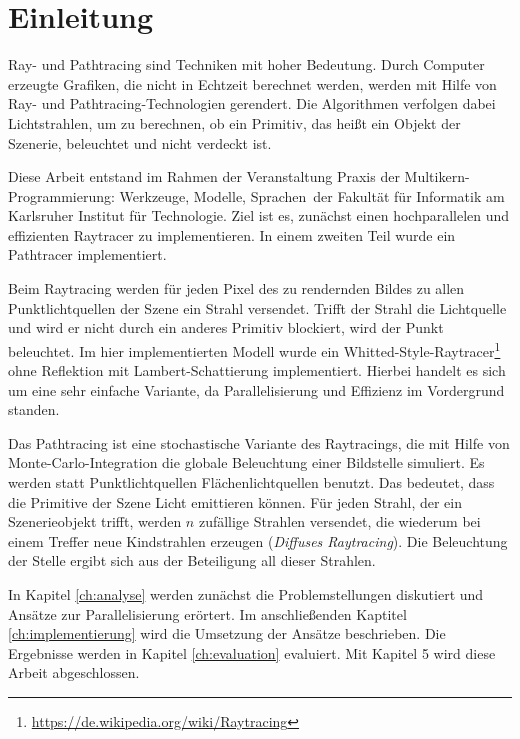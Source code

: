 
\chapter{Einleitung}
\label{ch:einleitung}

Ray- und Pathtracing sind Techniken mit hoher Bedeutung. Durch Computer erzeugte Grafiken, die nicht in Echtzeit berechnet werden, werden mit Hilfe von Ray- und Pathtracing-Technologien gerendert. Die Algorithmen verfolgen dabei Lichtstrahlen, um zu berechnen, ob ein Primitiv, das heißt ein Objekt der Szenerie, beleuchtet und nicht verdeckt ist.

Diese Arbeit entstand im Rahmen der Veranstaltung \glqq Praxis der Multikern-Programmie\-rung: Werkzeuge, Modelle, Sprachen\grqq \ der Fakultät für Informatik am Karlsruher Institut für Technologie. Ziel ist es, zunächst einen hochparallelen und effizienten Raytracer zu implementieren. In einem zweiten Teil wurde ein Pathtracer implementiert.

Beim Raytracing werden für jeden Pixel des zu rendernden Bildes zu allen Punktlichtquellen der Szene ein Strahl versendet. Trifft der Strahl die Lichtquelle und wird er nicht durch ein anderes Primitiv blockiert, wird der Punkt beleuchtet. Im hier implementierten Modell wurde ein Whitted-Style-Raytracer\footnote{\url{https://de.wikipedia.org/wiki/Raytracing}} ohne Reflektion mit Lambert-Schattierung implementiert. Hierbei handelt es sich um eine sehr einfache Variante, da Parallelisierung und Effizienz im Vordergrund standen.

Das Pathtracing ist eine stochastische Variante des Raytracings, die mit Hilfe von Monte-Carlo-Integration die globale Beleuchtung einer Bildstelle simuliert. Es werden statt Punktlichtquellen Flächenlichtquellen benutzt. Das bedeutet, dass die Primitive der Szene Licht emittieren können. Für jeden Strahl, der ein Szenerieobjekt trifft, werden $n$ zufällige Strahlen versendet, die wiederum bei einem Treffer neue Kindstrahlen erzeugen (\textit{Diffuses Raytracing}). Die Beleuchtung der Stelle ergibt sich aus der Beteiligung all dieser Strahlen.

In Kapitel \ref{ch:analyse} werden zunächst die Problemstellungen diskutiert und Ansätze zur Parallelisierung erörtert. Im anschließenden Kaptitel \ref{ch:implementierung} wird die Umsetzung der Ansätze beschrieben. Die Ergebnisse werden in Kapitel \ref{ch:evaluation} evaluiert. Mit Kapitel 5 wird diese Arbeit abgeschlossen.